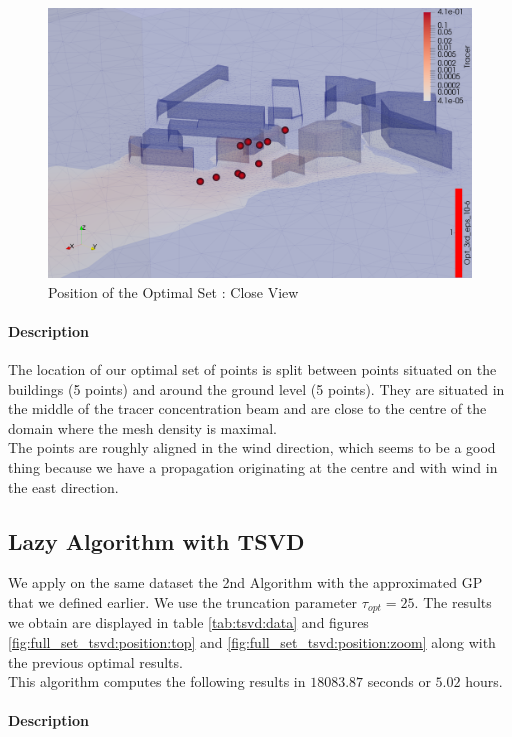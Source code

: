 \begin{figure}[h!]
\centering
\includegraphics[width=0.7\linewidth]{figures/MainOptimResults/alg3opteps10-6_zoom_screenshot}
\caption{Position of the Optimal Set : Close View}
\label{fig:full_set:position:zoom}
\end{figure}


\paragraph{Description}

The location of our optimal set of points is split between points situated on the buildings (5 points) and around the ground level (5 points). They are situated in the middle of the tracer concentration beam and are close to the centre of the domain where the mesh density is maximal. \\ 

The points are roughly aligned in the wind direction, which seems to be a good thing because we have a propagation originating at the centre and with wind in the east direction. 


\subsection{Lazy Algorithm with TSVD} \label{sec:res:TSVD}

We apply on the same dataset the 2nd Algorithm with the approximated GP that we defined earlier. We use the truncation parameter $\tau_{opt} = 25$. The results we obtain are displayed in table \ref{tab:tsvd:data} and figures \ref{fig:full_set_tsvd:position:top} and \ref{fig:full_set_tsvd:position:zoom} along with the previous optimal results. \\ 
 
This algorithm computes the following results in $18083.87$ seconds or $5.02$ hours. 
 
 \paragraph{Description}


